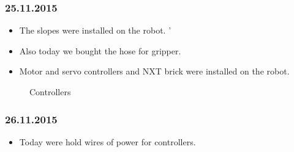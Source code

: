 \subsubsection{25.11.2015}
\begin{itemize}
\item The slopes were installed on the robot.
'\item Also today we bought the hose for gripper. 
\item Motor and servo controllers and NXT brick were installed on the robot.
\end{itemize}
\begin{figure}[H]
	\begin{minipage}[h]{1\linewidth}
		\caption{Controllers}
	\end{minipage}
\end{figure} 
\subsubsection{26.11.2015}
\begin{itemize}
\item Today were hold wires of power for controllers.
\end{itemize}
